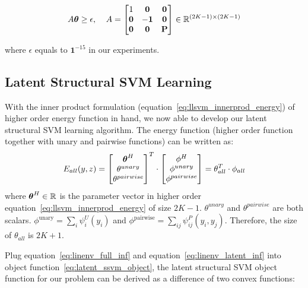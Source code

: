 \documentclass[sigconf, anonymous, review]{acmart}
\begin{document}
\begin{align}
  \label{eq:concave_constraint}
  A\boldsymbol{\theta}\geq\epsilon \text{,\;~~~} A=
                  \begin{bmatrix}
                    1 & \mathbf{0} & \mathbf{0}\\
                    \mathbf{0} & -\mathbf{1} & \mathbf{0}\\
                    \mathbf{0} & \mathbf{0} & \mathbf{P}
                  \end{bmatrix}\in \mathbb{R}^{(2K-1)\times(2K-1)}
\end{align}

\noindent where $\epsilon$ equals to $\mathbf{1}^{-15}$ in our
experiments.

\subsection{Latent Structural SVM Learning}
\label{sec:mrflssvm_learning_algo}

With the inner product formulation
(equation~\eqref{eq:llsvm_innerprod_energy}) of higher order
energy function in hand, we now able to develop our latent
structural SVM learning algorithm. The energy function (higher
order function together with unary and pairwise functions) can be
written as:
\begin{equation}
  E_{all}(y,z) = \begin{bmatrix}
    \boldsymbol{\theta}^H\\
    \theta^{unary}\\
    \theta^{pairwise}
  \end{bmatrix}^T 
  \cdot \begin{bmatrix}
    \phi^H\\
    \phi^{unary}\\
    \phi^{pairwise}
  \end{bmatrix}=\theta_{all}^T\cdot\phi_{all}
\end{equation}
where $\boldsymbol{\theta}^H\in \mathbb{R}$ is the parameter vector in higher
order equation~\eqref{eq:llsvm_innerprod_energy} of size $2K-1$.
$\theta^{unary}$ and $\theta^{pairwise}$ are both scalars.
$\phi^\textrm{unary} = \sum_i \psi^U_i\!(y_i)$ and
$\phi^\textrm{pairwise} = \sum_{ij} \psi^P_{ij}(y_i, y_j)$.
Therefore, the size of $\theta_{all}$ is $2K+1$.

Plug equation~\eqref{eq:linenv_full_inf} and
equation~\eqref{eq:linenv_latent_inf} into object
function~\eqref{eq:latent_ssvm_object}, the latent structural SVM
object function for our problem can be derived as a difference of
two convex functions:
\end{document}
